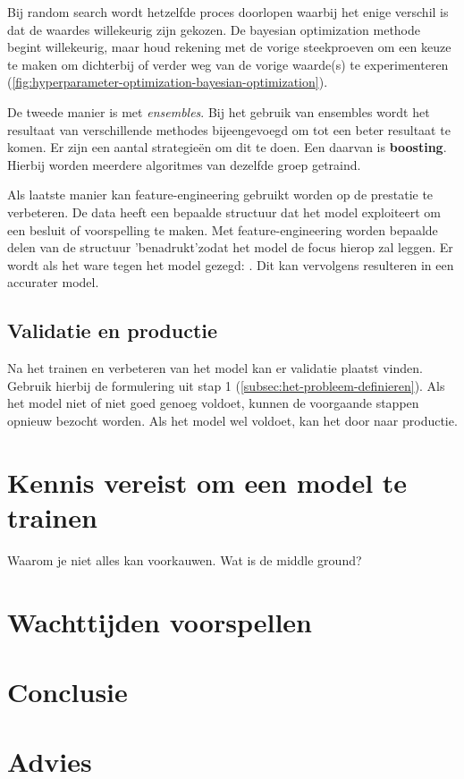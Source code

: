 Bij random search wordt hetzelfde proces doorlopen waarbij het enige verschil is dat de waardes willekeurig zijn gekozen. De bayesian optimization methode begint willekeurig, maar houd rekening met de vorige steekproeven om een keuze te maken om dichterbij of verder weg van de vorige waarde(s) te experimenteren (\autoref{fig:hyperparameter-optimization-bayesian-optimization}).

De tweede manier is met \textit{ensembles}. Bij het gebruik van ensembles wordt het resultaat van verschillende methodes bijeengevoegd om tot een beter resultaat te komen. Er zijn een aantal strategieën om dit te doen. Een daarvan is \textbf{boosting}. Hierbij worden meerdere algoritmes van dezelfde groep getraind.

Als laatste manier kan \gls{feature-engineering} gebruikt worden op de prestatie te verbeteren. De data heeft een bepaalde structuur dat het model exploiteert om een besluit of voorspelling te maken. Met \gls{feature-engineering} worden bepaalde delen van de structuur 'benadrukt'\space zodat het model de focus hierop zal leggen. Er wordt als het ware tegen het model gezegd: . Dit kan vervolgens resulteren in een accurater model.

\subsection{Validatie en productie}\label{subsec:validatie-en-productie}
Na het trainen en verbeteren van het model kan er validatie plaatst vinden. Gebruik hierbij de formulering uit stap 1 (\autoref{subsec:het-probleem-definieren}). Als het model niet of niet goed genoeg voldoet, kunnen de voorgaande stappen opnieuw bezocht worden. Als het model wel voldoet, kan het door naar productie.

\section{Kennis vereist om een model te trainen}\label{sec:kennis-vereist-om-een-model-te-trainen}
Waarom je niet alles kan voorkauwen.
Wat is de middle ground?

\section{Wachttijden voorspellen}\label{sec:wachttijden-voorspellen}


\section{Conclusie}\label{sec:conclusie}


\section{Advies}\label{sec:advies}
